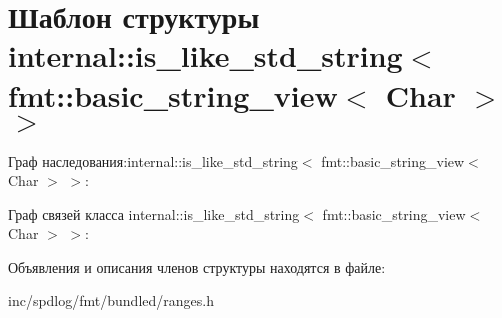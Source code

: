 \hypertarget{structinternal_1_1is__like__std__string_3_01fmt_1_1basic__string__view_3_01Char_01_4_01_4}{}\section{Шаблон структуры internal\+:\+:is\+\_\+like\+\_\+std\+\_\+string$<$ fmt\+:\+:basic\+\_\+string\+\_\+view$<$ Char $>$ $>$}
\label{structinternal_1_1is__like__std__string_3_01fmt_1_1basic__string__view_3_01Char_01_4_01_4}


Граф наследования\+:internal\+:\+:is\+\_\+like\+\_\+std\+\_\+string$<$ fmt\+:\+:basic\+\_\+string\+\_\+view$<$ Char $>$ $>$\+:


Граф связей класса internal\+:\+:is\+\_\+like\+\_\+std\+\_\+string$<$ fmt\+:\+:basic\+\_\+string\+\_\+view$<$ Char $>$ $>$\+:


Объявления и описания членов структуры находятся в файле\+:\begin{DoxyCompactItemize}
\item 
inc/spdlog/fmt/bundled/ranges.\+h\end{DoxyCompactItemize}
